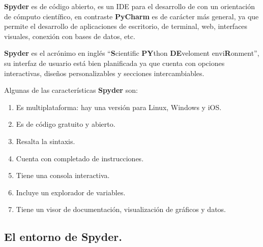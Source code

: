 \textbf{Spyder} es de código abierto, es un IDE para el desarrollo de \python{} con un orientación de cómputo científico, en contraste \textbf{PyCharm} es de carácter más general, ya que permite el desarrollo de aplicaciones de escritorio, de terminal, web, interfaces visuales, conexión con bases de datos, etc.
\par
\textbf{Spyder} es el acrónimo en inglés \enquote{\textbf{S}cientific \textbf{PY}thon \textbf{DE}veloment envi\textbf{R}onment}, su interfaz de usuario está bien planificada ya que cuenta con opciones interactivas, diseños personalizables y secciones intercambiables.
\par
Algunas de las características \textbf{Spyder} son:
\begin{enumerate}[label=\alph*)]
\item Es multiplataforma: hay una versión para Linux, Windows y iOS.
\item Es de código gratuito y abierto.
\item Resalta la sintaxis.
\item Cuenta con completado de instrucciones.
\item Tiene una consola interactiva.
\item Incluye un explorador de variables.
\item Tiene un visor de documentación, visualización de gráficos y datos.
\end{enumerate}

\subsection{El entorno de Spyder.}

